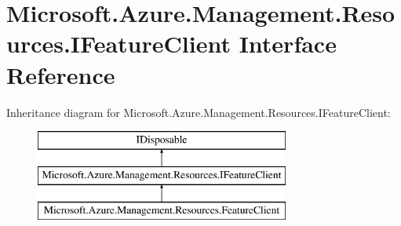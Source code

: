 \hypertarget{interface_microsoft_1_1_azure_1_1_management_1_1_resources_1_1_i_feature_client}{}\section{Microsoft.\+Azure.\+Management.\+Resources.\+I\+Feature\+Client Interface Reference}
\label{interface_microsoft_1_1_azure_1_1_management_1_1_resources_1_1_i_feature_client}


 


Inheritance diagram for Microsoft.\+Azure.\+Management.\+Resources.\+I\+Feature\+Client\+:\begin{figure}[H]
\begin{center}
\leavevmode
\includegraphics[height=3.000000cm]{interface_microsoft_1_1_azure_1_1_management_1_1_resources_1_1_i_feature_client}
\end{center}
\end{figure}
